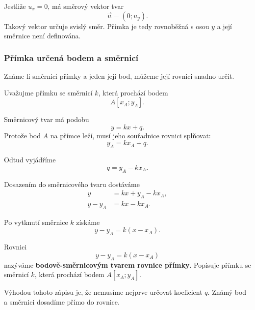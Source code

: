 Jestliže $u_x=0$, má směrový vektor tvar
\[
    \vec{u}=(0;u_y).
\]
Takový vektor určuje svislý směr. Přímka je tedy rovnoběžná s osou
$y$ a její směrnice není definována.

\subsubsection{Přímka určená bodem a směrnicí}
\label{subsubsec:Line_from_point_and_slope}

Známe-li směrnici přímky a jeden její bod, můžeme její rovnici snadno
určit.

Uvažujme přímku se směrnicí $k$, která prochází bodem
\[
    A[x_A;y_A].
\]

Směrnicový tvar má podobu
\[
    y=kx+q.
\]
Protože bod $A$ na přímce leží, musí jeho souřadnice rovnici splňovat:
\[
    y_A=kx_A+q.
\]

Odtud vyjádříme
\[
    q=y_A-kx_A.
\]

Dosazením do směrnicového tvaru dostáváme
\begin{align*}
    y
    &=
    kx+y_A-kx_A,\\
    y-y_A
    &=
    kx-kx_A.
\end{align*}

Po vytknutí směrnice $k$ získáme
\begin{equation}\label{eq:Point_slope_line_equation}
    y-y_A=k(x-x_A).
\end{equation}

\begin{definition}\label{def:Point_slope_line_equation}
    Rovnici
    \[
        y-y_A=k(x-x_A)
    \]
    nazýváme \textbf{bodově-směrnicovým tvarem rovnice přímky}.
    Popisuje přímku se směrnicí $k$, která prochází bodem
    $A[x_A;y_A]$.
\end{definition}

Výhodou tohoto zápisu je, že nemusíme nejprve určovat koeficient $q$.
Známý bod a směrnici dosadíme přímo do rovnice.

